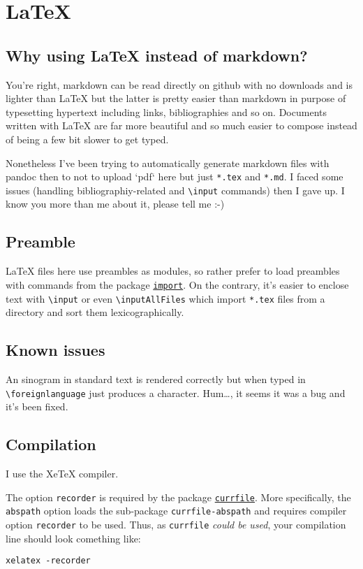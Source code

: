 \section{\LaTeX{}}

\subsection{Why using \LaTeX{} instead of markdown?}

You're right, markdown can be read directly on github with no downloads and is lighter than \LaTeX{} but the latter is pretty easier than markdown in purpose of typesetting hypertext including links, bibliographies and so on. Documents written with \LaTeX{} are far more beautiful and so much easier to compose instead of being a few bit slower to get typed.

Nonetheless I've been trying to automatically generate markdown files with pandoc then to not to upload `pdf` here but just \texttt{*.tex} and \texttt{*.md}. I faced some issues (handling bibliographiy-related and \texttt{\textbackslash{}input} commands) then I gave up. I know you more than me about it, please tell me :-)

\subsection{Preamble}

\LaTeX{} files here use preambles as modules, so rather prefer to load preambles with commands from the package \href{http://ctan.mines-albi.fr/macros/latex/contrib/import/import.pdf}{\texttt{import}}. On the contrary, it's easier to enclose text with \texttt{\textbackslash{}input} or even \texttt{\textbackslash{}inputAllFiles} which import \texttt{*.tex} files from a directory and sort them lexicographically.

\subsection{Known issues}

An sinogram in standard text is rendered correctly but when typed in \texttt{\textbackslash{}foreignlanguage} just produces a  character. Hum\dots{}, it seems it was a bug and it's been fixed.

\subsection{Compilation}

I use the Xe\TeX{} compiler.

The option \texttt{recorder} is required by the package \href{http://www.ctan.org/tex-archive/macros/latex/contrib/currfile}{\texttt{currfile}}. More specifically, the \texttt{abspath} option loads the sub-package \texttt{currfile-abspath} and requires compiler option \texttt{recorder} to be used. Thus, as \texttt{currfile} \textsl{could be used}, your compilation line should look comething like:

\begin{lstlisting}
xelatex -recorder
\end{lstlisting}
